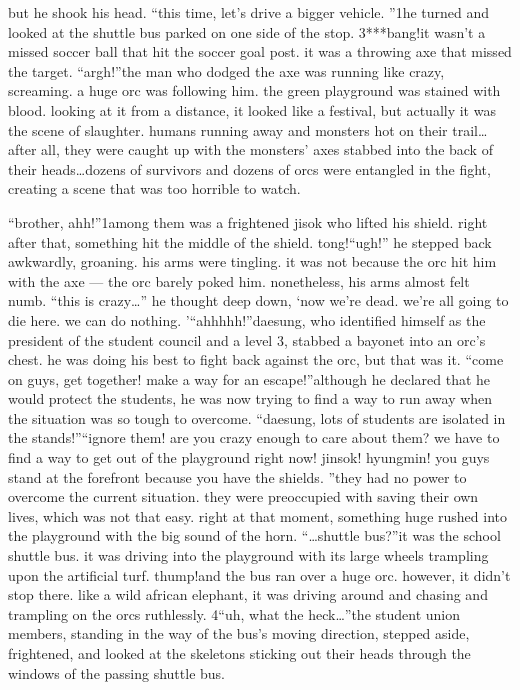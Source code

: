  but he shook his head.
“this time, let’s drive a bigger vehicle.
”1he turned and looked at the shuttle bus parked on one side of the stop.
3***bang!it wasn’t a missed soccer ball that hit the soccer goal post.
 it was a throwing axe that missed the target.
“argh!”the man who dodged the axe was running like crazy, screaming.
 a huge orc was following him.
the green playground was stained with blood.
 looking at it from a distance, it looked like a festival, but actually it was the scene of slaughter.
 humans running away and monsters hot on their trail… after all, they were caught up with the monsters’ axes stabbed into the back of their heads…dozens of survivors and dozens of orcs were entangled in the fight, creating a scene that was too horrible to watch.

“brother, ahh!”1among them was a frightened jisok who lifted his shield.
 right after that, something hit the middle of the shield.
tong!“ugh!” he stepped back awkwardly, groaning.
 his arms were tingling.
 it was not because the orc hit him with the axe — the orc barely poked him.
 nonetheless, his arms almost felt numb.
“this is crazy…” he thought deep down, ‘now we’re dead.
 we’re all going to die here.
 we can do nothing.
’“ahhhhh!”daesung, who identified himself as the president of the student council and a level 3, stabbed a bayonet into an orc’s chest.
 he was doing his best to fight back against the orc, but that was it.
“come on guys, get together! make a way for an escape!”although he declared that he would protect the students, he was now trying to find a way to run away when the situation was so tough to overcome.
“daesung, lots of students are isolated in the stands!”“ignore them! are you crazy enough to care about them? we have to find a way to get out of the playground right now! jinsok! hyungmin! you guys stand at the forefront because you have the shields.
”they had no power to overcome the current situation.
 they were preoccupied with saving their own lives, which was not that easy.
right at that moment, something huge rushed into the playground with the big sound of the horn.
“…shuttle bus?”it was the school shuttle bus.
 it was driving into the playground with its large wheels trampling upon the artificial turf.
thump!and the bus ran over a huge orc.
 however, it didn’t stop there.
 like a wild african elephant, it was driving around and chasing and trampling on the orcs ruthlessly.
4“uh, what the heck…”the student union members, standing in the way of the bus’s moving direction, stepped aside, frightened, and looked at the skeletons sticking out their heads through the windows of the passing shuttle bus.
